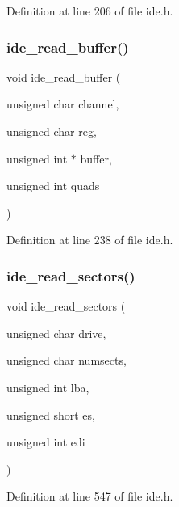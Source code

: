 Definition at line 206 of file ide.\+h.

\mbox{\label{a00005_a905d9e8d026f3b6f298cbf41c0bde7e2_a905d9e8d026f3b6f298cbf41c0bde7e2}} 
\subsubsection{\texorpdfstring{ide\+\_\+read\+\_\+buffer()}{ide\_read\_buffer()}}
{\footnotesize\ttfamily void ide\+\_\+read\+\_\+buffer (\begin{DoxyParamCaption}\item[{unsigned char}]{channel,  }\item[{unsigned char}]{reg,  }\item[{unsigned int $\ast$}]{buffer,  }\item[{unsigned int}]{quads }\end{DoxyParamCaption})}



Definition at line 238 of file ide.\+h.

\mbox{\label{a00005_a9dd84843412753d236e17a15277c5b98_a9dd84843412753d236e17a15277c5b98}} 
\subsubsection{\texorpdfstring{ide\+\_\+read\+\_\+sectors()}{ide\_read\_sectors()}}
{\footnotesize\ttfamily void ide\+\_\+read\+\_\+sectors (\begin{DoxyParamCaption}\item[{unsigned char}]{drive,  }\item[{unsigned char}]{numsects,  }\item[{unsigned int}]{lba,  }\item[{unsigned short}]{es,  }\item[{unsigned int}]{edi }\end{DoxyParamCaption})}



Definition at line 547 of file ide.\+h.

\mbox{\label{a00005_a31655fcec0cc8f9f8792b98cd4441fdf_a31655fcec0cc8f9f8792b98cd4441fdf}} 
